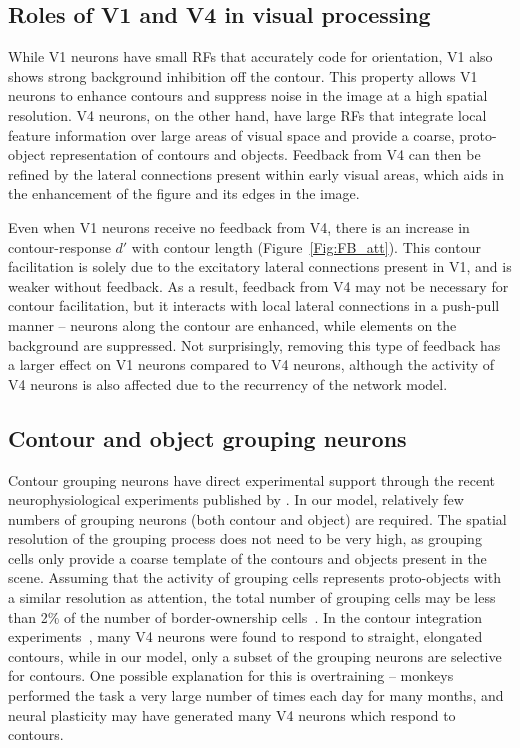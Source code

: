 \subsection{Roles of V1 and V4 in visual processing}

While V1 neurons have small RFs that accurately code for orientation, V1 also shows strong background inhibition off the contour. This property allows V1 neurons
to enhance contours and suppress noise in the image at a high spatial
resolution. V4 neurons, on the other hand, have large RFs that integrate
local feature information over large areas of visual space and provide
a coarse, proto-object representation of contours and objects.
Feedback from V4 can then be refined by the lateral connections present
within early visual areas, which aids in the enhancement of the figure
and its edges in the image.

Even when V1 neurons receive no feedback from V4, there is an
increase in contour-response $d'$ with contour length
(Figure~\ref{Fig:FB_att}). This contour facilitation is solely due to
the excitatory lateral connections present in V1, and is weaker
without feedback. As a result, feedback from V4 may not be necessary
for contour facilitation, but it interacts with local lateral
connections in a push-pull manner -- neurons along the contour are
enhanced, while elements on the background are suppressed. Not
surprisingly, removing this type of feedback has a larger effect on V1
neurons compared to V4 neurons, although the activity of V4 neurons is
also affected due to the recurrency of the network model.

\subsection{Contour and object grouping neurons}

Contour grouping neurons have direct experimental support through the
recent neurophysiological experiments published by \cite{Chen_etal14}.
In our model, relatively few numbers of grouping neurons (both contour
and object) are required. The spatial resolution of the grouping
process does not need to be very high, as grouping cells only provide
a coarse template of the contours and objects present in the
scene. Assuming that the activity of grouping cells represents
proto-objects with a similar resolution as attention, the total number
of grouping cells may be less than 2\% of the number of
border-ownership cells~\citep{Craft_etal07}. 
In the contour integration experiments~\citep{Chen_etal14}, many V4
neurons were found to respond to straight, elongated contours, while
in our model, only a subset of the grouping neurons are selective for
contours. One possible explanation for this is overtraining -- monkeys
performed the task a very large number of times
each day for many months, and
neural plasticity may have generated many V4 neurons
which respond to contours. 

